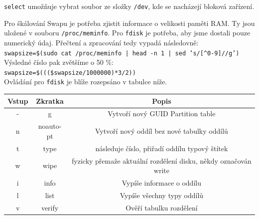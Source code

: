 \documentclass[12pt,a4paper,twoside,]{article}
\begin{document}
\hspace{-1.5em}\texttt{select} umožňuje vybrat soubor ze složky \texttt{/dev}, kde se nacházejí bloková zařízení.
\newpage
{Pro škálování Swapu je potřeba zjistit informace o velikosti paměti RAM. Ty jsou uložené v souboru \texttt{/proc/meminfo}. Pro \texttt{fdisk} je potřeba, aby jsme dostali pouze numerický údaj. Přečtení a zpracování tedy vypadá následovně:\\
	
\texttt{swapsize=\$(sudo cat /proc/meminfo | head -n 1 | sed 's/[\^{}0-9]//g')}\\

\hspace*{-1.5em}Výsledné číslo pak zvětšíme o 50 \%:\\ 

\texttt{swapsize=\$(((\$swapsize/1000000)*3/2))}\\

\hspace{-1.5em}Ovládání pro \texttt{fdisk} je blíže rozepsáno v tabulce níže.
\begin{table}[h]
	\begin{tabular}{|c|c|c|}\hline
		Vstup & Zkratka & Popis \\ \hline
		-&g&Vytvoří nový GUID Partition table \\ \hline
		n&noauto-pt&Vytvoří nový oddíl bez nové tabulky oddílů \\ \hline
		t&type&následuje číslo, přiřadí oddílu typový štítek \\ \hline
		w&wipe&fyzicky přemaže aktuální rozdělení disku, někdy označován write \\ \hline
		i&info&Vypíše informace o oddílu \\ \hline
		l&list&Vypíše všechny typy oddílů \\ \hline
		v&verify&Ověří tabulku rozdělení \\ \hline
	\end{tabular}
\end{table}




\newpage
}
\end{document}
